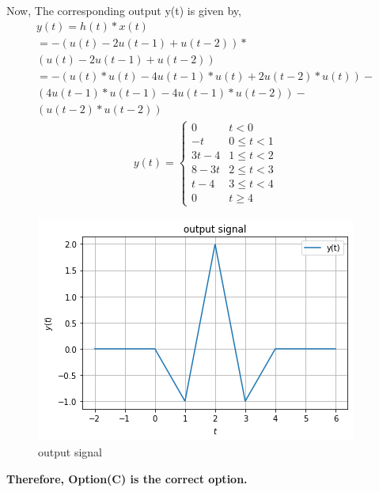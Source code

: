\documentclass[journal,12pt,twocolumn]{IEEEtran}
\begin{document}
Now, The corresponding output y(t) is given by,
\begin{multline}
    y(t) = h(t) * x(t)\\
    = -(u(t)-2u(t-1)+u(t-2))*\\(u(t)-2u(t-1)+u(t-2))\\
   = -(u(t)*u(t)-4u(t-1)*u(t)+2u(t-2)*u(t))-\\(4u(t-1)*u(t-1)-4u(t-1)*u(t-2))-\\(u(t-2)*u(t-2))
\end{multline}
\begin{align}
    y(t) = \begin{cases}
    0 & t<0\\
    -t & 0\le t < 1\\
    3t-4 & 1\le t <2 \\
    8-3t & 2\le t < 3\\
    t-4 & 3\le t<4\\
    0 & t\ge 4
    \end{cases}
\end{align}
 \begin{figure}[!htp]
\centering
 \includegraphics[width=\columnwidth]{output.png}
 \caption{output signal}
 \end{figure}
 \textbf{Therefore, Option(C) is the correct option.}
\end{document}
